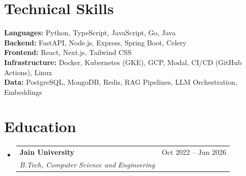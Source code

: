 \documentclass[letterpaper,11pt]{article}
\makeatletter
\newcommand{\resumeSubheading}[4]{
  \vspace{-2pt}\item
    \begin{tabular*}{0.97\textwidth}[t]{l@{\extracolsep{\fill}}r}
      \textbf{#1} & #2 \\
      \textit{\small#3} & \textit{\small #4} \\
    \end{tabular*}\vspace{-7pt}
}
\newcommand{\resumeSubHeadingListStart}{\begin{itemize}[leftmargin=0.15in, label={}]}
\newcommand{\resumeSubHeadingListEnd}{\end{itemize}}
\makeatother
\begin{document}
\section{Technical Skills}
\begin{itemize}[leftmargin=0.15in, label={}]
  \small{\item{
    \textbf{Languages:}{ Python, TypeScript, JavaScript, Go, Java} \\
    \textbf{Backend:}{ FastAPI, Node.js, Express, Spring Boot, Celery} \\
    \textbf{Frontend:}{ React, Next.js, Tailwind CSS} \\
    \textbf{Infrastructure:}{ Docker, Kubernetes (GKE), GCP, Modal, CI/CD (GitHub Actions), Linux} \\
    \textbf{Data:}{ PostgreSQL, MongoDB, Redis, RAG Pipelines, LLM Orchestration, Embeddings}
  }}
\end{itemize}

\section{Education}
\resumeSubHeadingListStart
  \resumeSubheading
    {Jain University}{Oct 2022 -- Jun 2026}
    {B.Tech, Computer Science and Engineering}{}
\resumeSubHeadingListEnd

\end{document}
